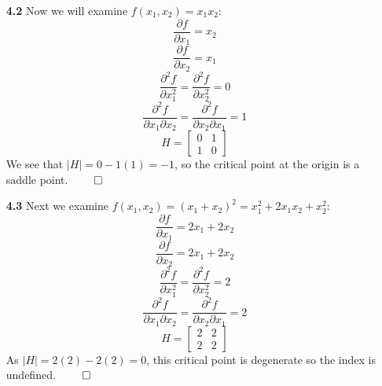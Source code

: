\documentclass[12pt]{report}
\begin{document}
\begin{enumerate}
\item[\bf 4.2] Now we will examine $f(x_1,x_2)=x_1x_2$:
$$\frac{\partial f}{\partial x_1} = x_2$$
$$\frac{\partial f}{\partial x_2} = x_1$$
$$\frac{\partial^2 f}{\partial x_1^2} = \frac{\partial^2 f}{\partial x_2^2} = 0$$
$$\frac{\partial^2 f}{\partial x_1\partial x_2} = \frac{\partial^2 f}{\partial x_2\partial x_1} = 1$$
$$H=\begin{bmatrix}
0 & 1 \\
1 & 0 
\end{bmatrix}$$
We see that $|H|=0-1(1)=-1$, so the critical point at the origin is a saddle point. $\qed$

\item[\bf 4.3] Next we examine $f(x_1,x_2)=(x_1+x_2)^2 = x_1^2+2x_1x_2+x_2^2$:
$$\frac{\partial f}{\partial x_1} = 2x_1+2x_2$$
$$\frac{\partial f}{\partial x_2} = 2x_1+2x_2$$
$$\frac{\partial^2 f}{\partial x_1^2} = \frac{\partial^2 f}{\partial x_2^2} = 2$$
$$\frac{\partial^2 f}{\partial x_1\partial x_2} = \frac{\partial^2 f}{\partial x_2\partial x_1} = 2$$
$$H=\begin{bmatrix}
2 & 2 \\
2 & 2 
\end{bmatrix}$$
As $|H|=2(2)-2(2) = 0$, this critical point is degenerate so the index is undefined. $\qed$


\end{enumerate}
\end{document}
